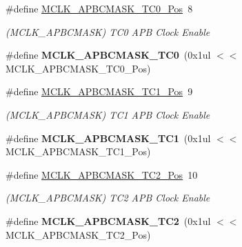 \begin{DoxyCompactItemize}
\item 
\hypertarget{group___s_a_m_l21___m_c_l_k_ga30976456f5f57cca14ea304b64fbb220}{}\#define \hyperlink{group___s_a_m_l21___m_c_l_k_ga30976456f5f57cca14ea304b64fbb220}{M\+C\+L\+K\+\_\+\+A\+P\+B\+C\+M\+A\+S\+K\+\_\+\+T\+C0\+\_\+\+Pos}~8\label{group___s_a_m_l21___m_c_l_k_ga30976456f5f57cca14ea304b64fbb220}

\begin{DoxyCompactList}\small\item\em (M\+C\+L\+K\+\_\+\+A\+P\+B\+C\+M\+A\+S\+K) T\+C0 A\+P\+B Clock Enable \end{DoxyCompactList}\item 
\hypertarget{group___s_a_m_l21___m_c_l_k_ga8b882c1f33ac77c836a097fde5af2750}{}\#define {\bfseries M\+C\+L\+K\+\_\+\+A\+P\+B\+C\+M\+A\+S\+K\+\_\+\+T\+C0}~(0x1ul $<$$<$ M\+C\+L\+K\+\_\+\+A\+P\+B\+C\+M\+A\+S\+K\+\_\+\+T\+C0\+\_\+\+Pos)\label{group___s_a_m_l21___m_c_l_k_ga8b882c1f33ac77c836a097fde5af2750}

\item 
\hypertarget{group___s_a_m_l21___m_c_l_k_ga12bd13f669204099d5d88f711d740364}{}\#define \hyperlink{group___s_a_m_l21___m_c_l_k_ga12bd13f669204099d5d88f711d740364}{M\+C\+L\+K\+\_\+\+A\+P\+B\+C\+M\+A\+S\+K\+\_\+\+T\+C1\+\_\+\+Pos}~9\label{group___s_a_m_l21___m_c_l_k_ga12bd13f669204099d5d88f711d740364}

\begin{DoxyCompactList}\small\item\em (M\+C\+L\+K\+\_\+\+A\+P\+B\+C\+M\+A\+S\+K) T\+C1 A\+P\+B Clock Enable \end{DoxyCompactList}\item 
\hypertarget{group___s_a_m_l21___m_c_l_k_gab0af8b41a1a97060adc66a720ee3f962}{}\#define {\bfseries M\+C\+L\+K\+\_\+\+A\+P\+B\+C\+M\+A\+S\+K\+\_\+\+T\+C1}~(0x1ul $<$$<$ M\+C\+L\+K\+\_\+\+A\+P\+B\+C\+M\+A\+S\+K\+\_\+\+T\+C1\+\_\+\+Pos)\label{group___s_a_m_l21___m_c_l_k_gab0af8b41a1a97060adc66a720ee3f962}

\item 
\hypertarget{group___s_a_m_l21___m_c_l_k_ga0e802290cbae7f31b5402ede4c2f5eef}{}\#define \hyperlink{group___s_a_m_l21___m_c_l_k_ga0e802290cbae7f31b5402ede4c2f5eef}{M\+C\+L\+K\+\_\+\+A\+P\+B\+C\+M\+A\+S\+K\+\_\+\+T\+C2\+\_\+\+Pos}~10\label{group___s_a_m_l21___m_c_l_k_ga0e802290cbae7f31b5402ede4c2f5eef}

\begin{DoxyCompactList}\small\item\em (M\+C\+L\+K\+\_\+\+A\+P\+B\+C\+M\+A\+S\+K) T\+C2 A\+P\+B Clock Enable \end{DoxyCompactList}\item 
\hypertarget{group___s_a_m_l21___m_c_l_k_ga485c02ada631ef44890736e3ee932ac9}{}\#define {\bfseries M\+C\+L\+K\+\_\+\+A\+P\+B\+C\+M\+A\+S\+K\+\_\+\+T\+C2}~(0x1ul $<$$<$ M\+C\+L\+K\+\_\+\+A\+P\+B\+C\+M\+A\+S\+K\+\_\+\+T\+C2\+\_\+\+Pos)\label{group___s_a_m_l21___m_c_l_k_ga485c02ada631ef44890736e3ee932ac9}


\end{DoxyCompactItemize}
